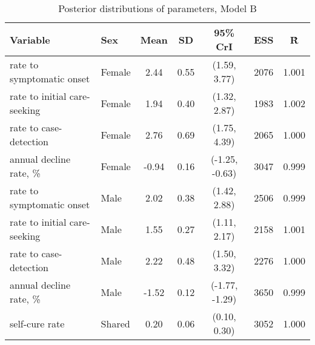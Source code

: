 \begin{table}[h]

\caption{\label{tab:}Posterior distributions of parameters, Model B}
\centering
\begin{tabular}[t]{llccccc}
\toprule
Variable & Sex & Mean & SD & 95\% CrI & ESS & \^{R}\\
\midrule
rate to symptomatic onset & Female & 2.44 & 0.55 & (1.59, 3.77) & 2076 & 1.001\\
rate to initial care-seeking & Female & 1.94 & 0.40 & (1.32, 2.87) & 1983 & 1.002\\
rate to case-detection & Female & 2.76 & 0.69 & (1.75, 4.39) & 2065 & 1.000\\
annual decline rate, \% & Female & -0.94 & 0.16 & (-1.25, -0.63) & 3047 & 0.999\\
\addlinespace
rate to symptomatic onset & Male & 2.02 & 0.38 & (1.42, 2.88) & 2506 & 0.999\\
rate to initial care-seeking & Male & 1.55 & 0.27 & (1.11, 2.17) & 2158 & 1.001\\
rate to case-detection & Male & 2.22 & 0.48 & (1.50, 3.32) & 2276 & 1.000\\
annual decline rate, \% & Male & -1.52 & 0.12 & (-1.77, -1.29) & 3650 & 0.999\\
\addlinespace
self-cure rate & Shared & 0.20 & 0.06 & (0.10, 0.30) & 3052 & 1.000\\
\bottomrule
\end{tabular}
\end{table}
